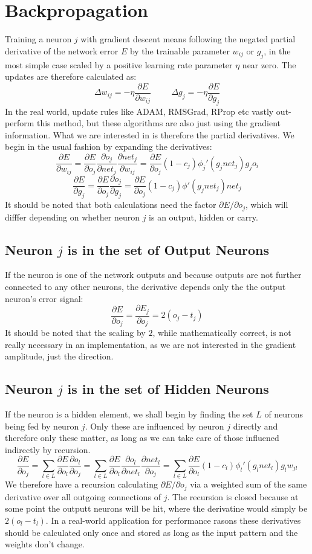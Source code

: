 \documentclass[a4paper,11pt]{article}
\begin{document}
\section{Backpropagation}
Training a neuron $j$ with gradient descent means following the negated partial derivative of the network error $E$ by the trainable parameter $w_{ij}$ or $g_j$, in the most simple case scaled by a positive learning rate parameter $\eta$ near zero. The updates are therefore calculated as:
\[ \Delta w_{ij}=-\eta\frac{\partial E}{\partial w_{ij}}  \hspace{1cm}  \Delta g_j = -\eta\frac{\partial E}{\partial g_j} \]
In the real world, update rules like ADAM, RMSGrad, RProp etc vastly out-perform this method, but these algorithms are also just using the gradient information. What we are interested in is therefore the partial derivatives. We begin in the usual fashion by expanding the derivatives:
\[ \frac{\partial E}{\partial w_{ij}} = \frac{\partial E}{\partial o_j}\frac{\partial o_j}{\partial net_j}\frac{\partial net_j}{\partial w_{ij}} = \frac{\partial E}{\partial o_j} (1-c_j)\phi_j'(g_jnet_j)g_jo_i \]
\[ \frac{\partial E}{\partial g_j} = \frac{\partial E}{\partial o_j}\frac{\partial o_j}{\partial g_j}= \frac{\partial E}{\partial o_j}(1-c_j)\phi'(g_jnet_j)net_j  \]
It should be noted that both calculations need the factor $\partial E/\partial o_j$, which will difffer depending on whether neuron $j$ is an output, hidden or carry. 
\subsection{ Neuron $j$ is in the set of Output Neurons}
If the neuron is one of the network outputs and because outputs are not further connected to any other neurons, the derivative depends only the the output neuron's error signal:
\[ \frac{\partial E}{\partial o_j}=\frac{\partial E_j}{\partial o_j}= 2(o_j-t_j) \]
It should be noted that the scaling by $2$, while mathematically correct, is not really necessary in an implementation, as we are not interested in the gradient amplitude, just the direction.
\subsection{ Neuron $j$ is in the set of Hidden Neurons}
If the neuron is a hidden element, we shall begin by finding the set $L$ of neurons being fed by neuron $j$. Only these are influenced by neuron $j$ directly and therefore only these matter, as long as we can take care of those influened indirectly by recursion.
\[ \frac{\partial E}{\partial o_j}=\sum_{l\in L}\frac{\partial E}{\partial o_l}\frac{\partial o_l}{\partial o_j} = \sum_{l\in L}\frac{\partial E}{\partial o_l}\frac{\partial o_l}{\partial net_l}\frac{\partial net_l}{\partial o_j} = \sum_{l\in L}\frac{\partial E}{\partial o_l} (1-c_l)\phi_l'(g_lnet_l)g_lw_{jl} \] 
We therefore have a recursion calculating $\partial E/\partial o_j$ via a weighted sum of the same derivative over all outgoing connections of $j$. The recursion is closed because at some point the outputt neurons will be hit, where the derivatine would simply be $2(o_l-t_l)$. In a real-world application for performance rasons these derivatives should be calculated only once and stored as long as the input pattern and the weights don't change.
\end{document}

